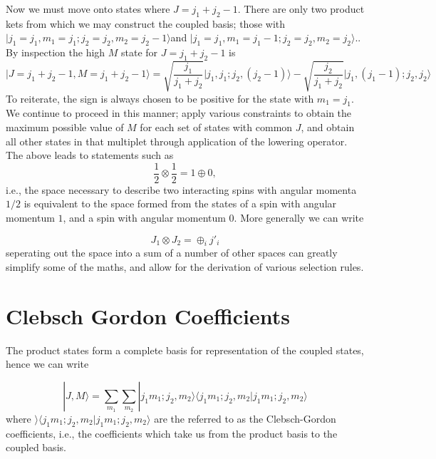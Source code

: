 \documentclass[12pt]{article}
\begin{document}
\noindent Now we must move onto states where $J= j_{1}+j_{2}-1$. There are only
two product kets from which we may construct the coupled basis; those with $|
j_{1}=j_{1}, m_{1}=j_{1}; j_{2}=j_{2}, m_{2} = j_{2}-1\rangle $and  
$| j_{1}=j_{1}, m_{1}=j_{1}-1; j_{2}=j_{2}, m_{2} = j_{2}\rangle. $. By
inspection the high $M$ state for $J=j_{1}+j_{2}-1$ is
\begin{equation}
|J= j_{1}+j_{2}-1, M=j_{1}+j_{2}-1\rangle =
 \sqrt{\frac{j_{1}}{j_{1}+j_{2}}} \Bigg|j_{1}, j_{1}; j_{2}, (j_{2}-1) \Bigg\rangle
-\sqrt{\frac{j_{2}}{j_{1}+j_{2}}} \Bigg|j_{1}, (j_{1}-1); j_{2}, j_{2} \Bigg\rangle
\end{equation}
\noindent To reiterate, the sign is always chosen to be positive for the state
with $m_{1}=j_{1}$.\\

\noindent We continue to proceed in this manner; apply various constraints to
obtain the maximum possible value of $M$ for each set of states with common
$J$, and obtain all other states in that multiplet through application of the
lowering operator.\\

\noindent The above leads to statements such as 
\begin{equation}
\frac{1}{2}\otimes\frac{1}{2}=1\oplus 0,
\end{equation}
i.e., the space necessary to describe two interacting spins with angular
momenta $1/2$ is equivalent to the space formed from the states of a spin with
angular momentum $1$, and a spin with angular momentum $0$. More generally we
can write

\begin{equation}
J_{1}\otimes J_{2} = \oplus_{i} j'_{i}
\end{equation}
seperating out the space into a sum of a number of other spaces can greatly
simplify some of the maths, and allow for the derivation of various selection
rules.

\section{Clebsch Gordon Coefficients}
The product states form a complete basis for representation of the coupled
states, hence we can write

\begin{equation}
|J, M \rangle=  \sum_{m_{1}}\sum_{m_{2}}
|j_{1}m_{1};j_{2},m_{2}\rangle\langle j_{1}m_{1};j_{2},m_{2}|
j_{1}m_{1};j_{2},m_{2}\rangle 
\end{equation}
\noindent where $\rangle\langle
j_{1}m_{1};j_{2},m_{2}|j_{1}m_{1};j_{2},m_{2}\rangle $ are the referred to as
the Clebsch-Gordon coefficients, i.e., the coefficients which take us from the
product basis to the coupled basis.\\
 
\end{document}
